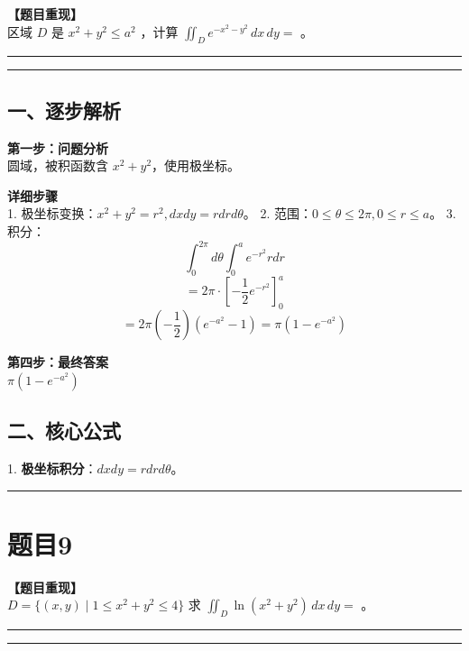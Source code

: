 \documentclass[12pt, a4paper]{ctexart}
\newcommand{\TopSeparator}{
    \par\noindent\rule{\textwidth}{1.5pt}\vspace{0.5em} %
}
\newcommand{\AnalysisSeparator}{
    \par\noindent\rule{\textwidth}{0.5pt}\vspace{0.2em}\hrule\vspace{0.5em} %
}
\newenvironment{RedAnalysis}{
    \par
    \color{red} %
}{
    \par
    \color{black} %
}
\begin{document}
\textbf{【题目重现】} \\
区域 $D$ 是 $ x^{2} + y^{2} \leq a^{2} $ ，计算 $ \iint_{D} e^{-x^{2}-y^{2}} \, dx \, dy = $ \underline{\hspace{2cm}}。

\AnalysisSeparator

\begin{RedAnalysis}

\subsection*{一、逐步解析}

\textbf{第一步：问题分析} \\
圆域，被积函数含 $x^2+y^2$，使用极坐标。

\textbf{详细步骤} \\
1. 极坐标变换：$x^2+y^2 = r^2, dxdy = r dr d\theta$。
2. 范围：$0 \le \theta \le 2\pi, 0 \le r \le a$。
3. 积分：
   \[ \int_0^{2\pi} d\theta \int_0^a e^{-r^2} r dr \]
   \[ = 2\pi \cdot [-\frac{1}{2}e^{-r^2}]_0^a \]
   \[ = 2\pi (-\frac{1}{2})(e^{-a^2} - 1) = \pi (1 - e^{-a^2}) \]

\textbf{第四步：最终答案} \\
$ \pi (1 - e^{-a^2}) $

\subsection*{二、核心公式}
1. \textbf{极坐标积分}：$dxdy = r dr d\theta$。

\end{RedAnalysis}

\vspace{2em}

\TopSeparator
\section*{题目9}

\textbf{【题目重现】} \\
$ D = \{(x, y) \mid 1 \leq x^{2} + y^{2} \leq 4\} $ 求 $ \iint_{D} \ln(x^{2} + y^{2}) \, dx \, dy = $ \underline{\hspace{2cm}}。

\AnalysisSeparator
\end{document}
